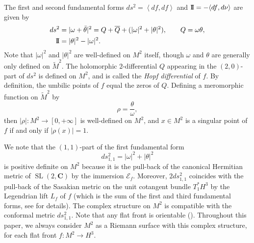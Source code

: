 \documentclass[a4paper]{amsart}
\theoremstyle{plain}
\theoremstyle{remark}
\numberwithin{equation}{section}
\begin{document}
The first and second fundamental forms $ds^2={\left\langle{{df}},{{df}}\right\rangle}$
and ${\mbox{I\!I}}=-{\left\langle{{df}},{{d\nu}}\right\rangle}$ are given by 
\begin{equation}\label{fff-sff}
\begin{aligned}
 ds^2&=|\omega+\bar \theta|^2= 
   Q + \overline Q + 
      (|\omega|^2+|\theta|^2), \qquad Q=\omega\theta  , \\
 {\mbox{I\!I}}&=|\theta|^2-|\omega|^2 . 
\end{aligned}
\end{equation}
Note that
$|\omega|^2$ and $|\theta|^2$ are well-defined on $M^2$ itself, 
though $\omega$ and $\theta$ are 
generally only defined on $\widetilde M^2$. 
The holomorphic $2$-differential $Q$ appearing in the $(2,0)$-part of
$ds^2$ is defined on $M^2$, 
and is called the {\it Hopf differential\/} of $f$.
By definition, the umbilic points of $f$ equal the zeros of $Q$.  
Defining a meromorphic function on $\widetilde{M}^2$ by 
\begin{equation}\label{eq:rho-def}
   \rho=\frac{\theta}{\omega}  , 
\end{equation}
then $|\rho|\colon{}M^2\to[0,+\infty]$ is well-defined
on $M^2$, 
and $x\in M^2$ is a singular point of $f$ if and only
if $|\rho(x)|=1$.

We note that the $(1,1)$-part of the first fundamental form 
\begin{equation}\label{eq:one-one-part}
     ds^2_{1,1}=|\omega|^2+|\theta|^2
\end{equation}
is positive definite on $M^2$ because 
it is the pull-back of 
the canonical Hermitian metric of ${\operatorname{SL}}(2,{\boldsymbol{C}})$ by the immersion ${\mathcal{E}}_f$. 
Moreover, $2ds^2_{1,1}$ coincides with the  pull-back of the Sasakian
metric on the unit cotangent bundle $T^*_1 H^3$ by the Legendrian 
lift $L_f$ of $f$ 
(which is the sum of the first and third fundamental forms, 
see \cite[Section 2]{KUY2} for details).  
The complex structure on $M^2$ is 
compatible with
the conformal metric $ds^2_{1,1}$.  
Note that any flat front is orientable (\cite[Theorem B]{KRUY}).
Throughout this paper, we always 
consider $M^2$ as a Riemann surface 
with this complex structure, 
for each flat front $f\colon{}M^2\to H^3$.
\end{document}
